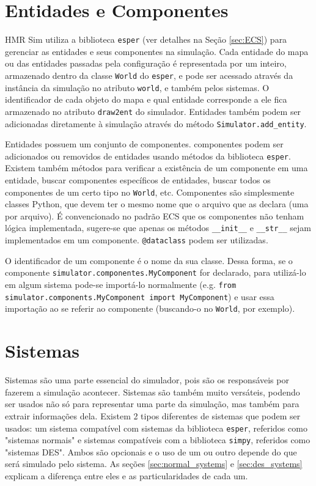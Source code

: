 \section{Entidades e Componentes}
\label{sec:ents_and_components}

HMR Sim utiliza a biblioteca \texttt{esper} \cite{esper} (ver detalhes na Seção \ref{sec:ECS}) para gerenciar as entidades e seus componentes na simulação. Cada entidade do mapa ou das entidades passadas pela configuração é representada por um inteiro, armazenado dentro da classe \texttt{World} do \texttt{esper}, e pode ser acessado através da instância da simulação no atributo \texttt{world}, e também pelos sistemas. O identificador de cada objeto do mapa e qual entidade corresponde a ele fica armazenado no atributo \texttt{draw2ent} do simulador. Entidades também podem ser adicionadas diretamente à simulação através do método \texttt{Simulator.add\_entity}.

Entidades possuem um conjunto de componentes. componentes podem ser adicionados ou removidos de entidades usando métodos da biblioteca \texttt{esper}. Existem também métodos para verificar a existência de um componente em uma entidade, buscar componentes específicos de entidades, buscar todos os componentes de um certo tipo no \texttt{World}, etc. Componentes são simplesmente classes Python, que devem ter o mesmo nome que o arquivo que as declara (uma por arquivo). É convencionado no padrão ECS que os componentes não tenham lógica implementada, sugere-se que apenas os métodos \texttt{\_\_init\_\_} e \texttt{\_\_str\_\_} sejam implementados em um componente. \texttt{@dataclass} podem ser utilizadas. 

O identificador de um componente é o nome da sua classe. Dessa forma, se o componente \texttt{simulator.componentes.MyComponent} for declarado, para utilizá-lo em algum sistema pode-se importá-lo normalmente (e.g. \texttt{from simulator.components.MyComponent import MyComponent}) e usar essa importação ao se referir ao componente (buscando-o no \texttt{World}, por exemplo).

\section{Sistemas}
\label{sec:systems}

Sistemas são uma parte essencial do simulador, pois são os responsáveis por fazerem a simulação acontecer. Sistemas são também muito versáteis, podendo ser usados não só para representar uma parte da simulação, mas também para extrair informações dela. Existem 2 tipos diferentes de sistemas que podem ser usados: um sistema compatível com sistemas da biblioteca \texttt{esper}, referidos como "sistemas normais" e sistemas compatíveis com a biblioteca \texttt{simpy}, referidos como "sistemas DES". Ambos são opcionais e o uso de um ou outro depende do que será simulado pelo sistema. As seções \ref{sec:normal_systems} e \ref{sec:des_systems} explicam a diferença entre eles e as particularidades de cada um.

